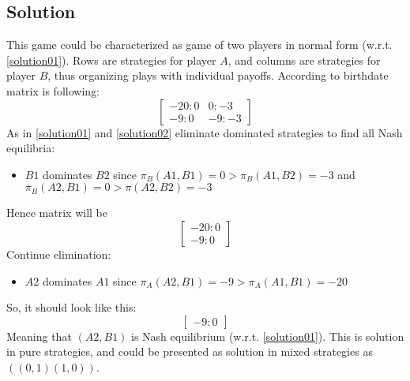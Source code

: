 \documentclass[
	a4paper, %
	11pt, %
]{CSUniSchoolLabReport}
\begin{document}
\subsection{Solution}\label{solution03}
This game could be characterized as game of two players in normal form (w.r.t. \ref{solution01}). Rows are strategies for player $A$, and columns are strategies for player $B$, thus organizing plays with individual payoffs. According to birthdate matrix is following:
$$
\begin{bmatrix}
    -20:0 & 0:-3 \\
    -9:0 & -9:-3
\end{bmatrix}
$$
As in \ref{solution01} and \ref{solution02} eliminate dominated strategies to find all Nash equilibria:
\begin{itemize}
    \item $B1$ dominates $B2$ since $\pi_B(A1, B1) = 0 > \pi_B(A1, B2) = -3$ and $\pi_B(A2, B1) = 0 > \pi(A2, B2) = -3$
\end{itemize}\hspace{2pt}

Hence matrix will be
$$
\begin{bmatrix}
    -20:0 \\
    -9:0
\end{bmatrix}
$$
Continue elimination:
\begin{itemize}
    \item $A2$ dominates $A1$ since $\pi_A(A2,B1) = -9 > \pi_A(A1, B1) = -20$
\end{itemize}\hspace{2pt}

So, it should look like this:
$$
\begin{bmatrix}
    -9:0
\end{bmatrix}
$$
Meaning that $(A2, B1)$ is Nash equilibrium (w.r.t. \ref{solution01}). This is solution in pure strategies, and could be presented as solution in mixed strategies as $((0, 1)(1, 0))$.
\end{document}
